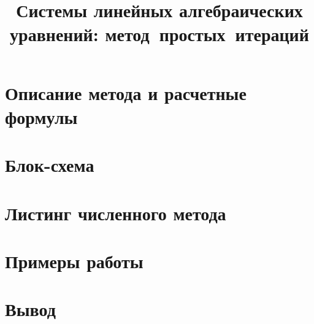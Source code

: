 \documentclass{../itmo-lab-report}
\title{Системы линейных алгебраических уравнений: метод~простых~итераций}
\begin{document}
    \maketitle
    \tableofcontents
    \newpage

    \section{Описание метода и расчетные формулы}
    
    \newpage

    \section{Блок-схема}
    

    \section{Листинг численного метода}
    \newpage

    \section{Примеры работы}
    
    \newpage

    \section{Вывод}
    
\end{document}
